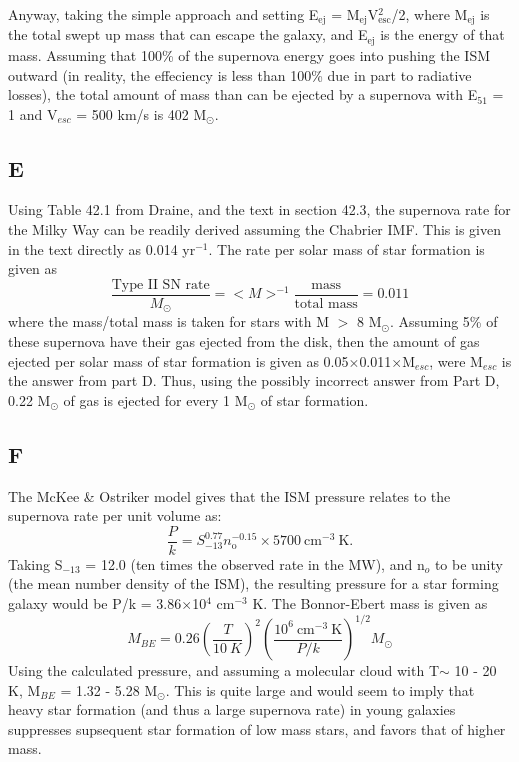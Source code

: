 \documentclass[a4paper]{article}
\begin{document}
Anyway, taking the simple approach and setting 
E$_{\text{ej}}$ = M$_{\text{ej}}$V$^2_{\text{esc}}$/2, where M$_{\text{ej}}$ is 
the total swept up mass that can escape the galaxy, and E$_{\text{ej}}$ is the
energy of that mass. Assuming that 100\% of the supernova energy goes into
pushing the ISM outward (in reality, the effeciency is less than 100\% due
in part to radiative losses), the total amount of mass than can be ejected
by a supernova with E$_{51}$ = 1 and V$_{esc}$ = 500 km/s is 402 M$_{\odot}$. 

\subsection{E}
Using Table 42.1 from Draine, and the text in section 42.3, the supernova rate
for the Milky Way can be readily derived assuming the Chabrier IMF. This is 
given in the text directly as 0.014 yr$^{-1}$. The rate per solar
mass of star formation is given as
\begin{equation}
\frac{\text{Type II SN rate}}{M_{\odot}} = <M>^{-1}\frac{\text{mass}}{\text{total mass}} = 0.011
\end{equation}
where the mass/total mass is taken for stars with M $>$ 8 M$_{\odot}$. Assuming 5\% of these supernova have their gas ejected from the disk, then the amount
of gas ejected per solar mass of star formation is given as 
0.05$\times$0.011$\times$M$_{esc}$, were M$_{esc}$ is the answer from part
D. Thus, using the possibly incorrect answer from Part D,  0.22 M$_{\odot}$ of 
gas is ejected for every 1 M$_{\odot}$ of star formation.

\subsection{F}
The McKee \& Ostriker model gives that the ISM pressure relates to the
supernova rate per unit volume as:
\begin{equation}
\frac{P}{k} = S^{0.77}_{-13}n_{\text{o}}^{-0.15}\times5700~\text{cm}^{-3}~\text{K}.
\end{equation}
Taking S$_{-13}$ = 12.0 (ten times the observed rate in the MW), and n$_{o}$ to
be unity (the mean number density of the ISM), the resulting pressure for a 
star forming galaxy would be P/k = 3.86$\times$10$^{4}$ cm$^{-3}$ K. The 
Bonnor-Ebert mass is given as
\begin{equation}
M_{BE} = 0.26\left(\frac{T}{10 ~K}\right)^{2}\left(\frac{10^6 ~\text{cm}^{-3}~ \text{K}}{P/k}\right)^{1/2} M_{\odot}
\end{equation}
Using the calculated pressure, and assuming a molecular cloud with T$\sim$ 10 - 20 K,
M$_{BE}$ = 1.32 - 5.28 M$_{\odot}$. This is quite large and would seem to imply
that heavy star formation (and thus a large supernova rate) in young galaxies
suppresses supsequent star formation of low mass stars, and favors that of
higher mass. 
\end{document}
